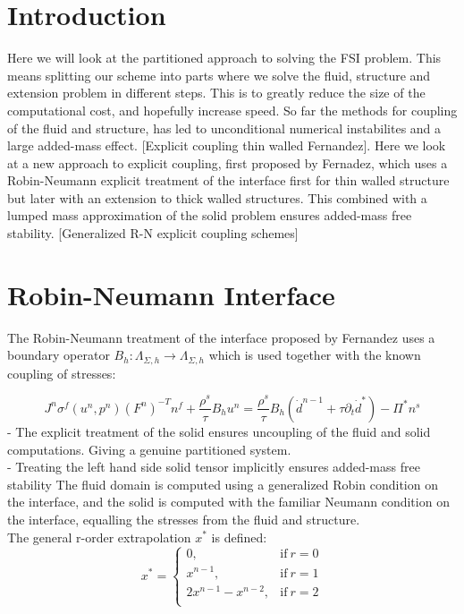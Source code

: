 


\section*{Introduction}
Here we will look at the partitioned approach to solving the FSI problem. This means splitting our scheme into parts where we solve the fluid, structure and extension problem in different steps. This is to greatly reduce the size of the computational cost, and hopefully increase speed. So far the methods for coupling of the fluid and structure, has led to unconditional numerical instabilites and a large added-mass effect. [Explicit coupling thin walled Fernandez]. Here we look at a new approach to explicit coupling, first proposed by Fernadez, which uses a Robin-Neumann explicit treatment of the interface first for thin walled structure but later with an extension to thick walled structures. This combined with a lumped mass approximation of the solid problem ensures added-mass free stability. [Generalized R-N explicit coupling schemes]

\section*{Robin-Neumann Interface}
The Robin-Neumann treatment of the interface proposed by Fernandez uses a boundary operator $ B_h : \Lambda_{\Sigma, h} \rightarrow \Lambda_{\Sigma, h}  $ which is used together with the known coupling of stresses:

$$  J^n \sigma^f(u^n, p^n)(F^n)^{-T}n^f + \frac{\rho^s}{\tau} B_h u^n = \frac{\rho^s}{\tau} B_h (\dot{d}^{n-1} + \tau \partial_t \dot{d}^*  ) - \Pi^{*} n^s $$
- The explicit treatment of the solid ensures uncoupling of the fluid and solid computations. Giving a genuine partitioned system. \\
- Treating the left hand side solid tensor implicitly ensures added-mass free stability
The fluid domain is computed using a generalized Robin condition on the interface, and the solid is computed with the familiar Neumann condition on the interface, equalling the stresses from the fluid and structure.\\
The general r-order extrapolation $x^*$ is defined: 
\begin{equation}
    x^*=
    \begin{cases}
      0, & \text{if}\ r=0 \\
      x^{n-1}, & \text{if}\ r =1 \\
      2x^{n-1} - x^{n-2}, & \text{if}\ r =2 \\
    \end{cases}
\end{equation}


